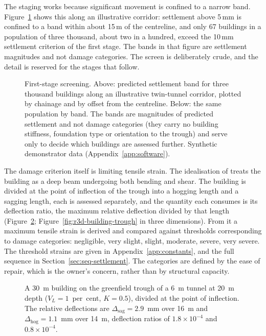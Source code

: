 The staging works because significant movement is confined to a narrow band.
Figure~\ref{fig:settlement-screening} shows this along an
illustrative corridor: settlement above 5\,mm is confined to a band within
about 15\,m of the centreline, and only 67 buildings in a population of three
thousand, about two in a hundred, exceed the 10\,mm settlement criterion
of the first stage. The bands
in that figure are settlement magnitudes and not damage categories. The screen
is deliberately crude, and the detail is reserved for the stages that follow.

\begin{figure}[htbp]
\centering
{}
\par\smallskip
{}
\caption[First-stage settlement screening across a building population]{%
First-stage screening. Above: predicted settlement band for
three thousand buildings along an illustrative twin-tunnel corridor, plotted by
chainage and by offset from the centreline. Below: the same population by band.
The bands are magnitudes of predicted settlement and not damage categories
(they carry no building stiffness, foundation type or orientation to the
trough) and serve only to decide which buildings are assessed
further. Synthetic demonstrator data (Appendix~\ref{app:software}).}
\label{fig:settlement-screening}
\end{figure}

The damage criterion itself is limiting tensile strain. The idealisation of
\citet{burland1974settlement} treats the building as a deep beam undergoing both bending and shear.
The building is divided at the point of inflection of the trough into a
hogging length and a sagging length, each is assessed separately, and the
quantity each consumes is its deflection ratio, the maximum relative
deflection divided by that length (Figure~\ref{fig:deflection-ratio}; Figure~\ref{fig:r3d-building-trough} in three dimensions). From it a maximum tensile strain is derived
and compared against thresholds
corresponding to damage categories: negligible, very slight, slight,
moderate, severe, very severe. The threshold strains are given in
Appendix~\ref{app:constants}, and the full sequence in
Section~\ref{sec:seq-settlement}. The categories are defined by the ease of
repair, which is the owner's concern, rather than by structural capacity.

\begin{figure}[htbp]
\centering
{}
\caption{A 30~m building on the greenfield trough of a 6~m tunnel at 20~m depth ($V_L = 1$~per~cent, $K = 0.5$), divided at the point of inflection. The relative deflections are $\Delta_{\mathrm{sag}} = 2.9$~mm over 16~m and $\Delta_{\mathrm{hog}} = 1.1$~mm over 14~m, deflection ratios of $1.8 \times 10^{-4}$ and $0.8 \times 10^{-4}$.}
\label{fig:deflection-ratio}
\end{figure}

